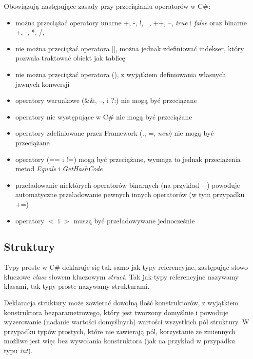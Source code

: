 Obowiązują następujące zasady przy przeciążaniu operatorów w C\#:
\begin{itemize}
\item można przeciążać operatory unarne +, -, !, ~, ++, --, {\em true} i {\em false} oraz binarne
+, -, *, /, %
\item nie można przeciążać operatora [], można jednak zdefiniować indekser, który pozwala traktować obiekt jak tablicę
\item nie można przeciążać operatora (), z wyjątkiem definiowania własnych jawnych konwersji
\item operatory warunkowe (\&\&, --, i ?:) nie mogą być przeciążane
\item operatory nie występujące w C\# nie mogą być przeciążane
\item operatory zdefiniowane przez Framework (., =, {\em new}) nie mogą być przeciążane   
\item operatory (== i !=) mogą być przeciążane, wymaga to jednak przeciążenia metod {\em Equals} i {\em GetHashCode}
\item przeładowanie niektórych operatorów binarnych (na przykład +) powoduje automatyczne przeładowanie pewnych
innych operatorów (w tym przypadku +=)
\item operatory $<$ i $>$ muszą być przeładowywane jednocześnie
\end{itemize}

\subsection{Struktury}

Typy proste w C\# deklaruje się tak samo jak typy referencyjne, zastępując słowo kluczowe {\em class}
słowem kluczowym {\em struct}. Tak jak typy referencyjne nazywamy klasami, tak typy proste nazywamy
strukturami.

Deklaracja struktury może zawierać dowolną ilość konstruktorów, z wyjątkiem konstruktora bezparametrowego,
który jest tworzony domyślnie i powoduje wyzerowanie (nadanie wartości domyślnych) wartości wszystkich
pól struktury. W przypadku typów prostych, które nie zawierają pól, korzystanie ze zmiennych możliwe jest więc
bez wywołania konstruktora (jak na przykład w przypadku typu {\em int}).

